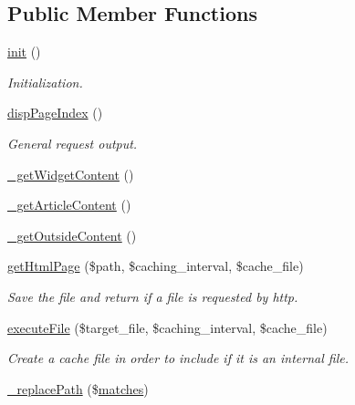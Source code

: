 \subsection*{Public Member Functions}
\begin{DoxyCompactItemize}
\item 
\hyperlink{classpageView_a203a3f77c9ece543e00517e647f1e07b}{init} ()
\begin{DoxyCompactList}\small\item\em Initialization. \end{DoxyCompactList}\item 
\hyperlink{classpageView_a9e3cf0b29ff11a4bbb1ec1ccfacd4236}{disp\+Page\+Index} ()
\begin{DoxyCompactList}\small\item\em General request output. \end{DoxyCompactList}\item 
\hyperlink{classpageView_a5f10c6cf83c7e65e3359423211ead3d8}{\+\_\+get\+Widget\+Content} ()
\item 
\hyperlink{classpageView_a8f6d1347a1991eec2ae2b964f5fec274}{\+\_\+get\+Article\+Content} ()
\item 
\hyperlink{classpageView_aa8045c86496ebdaa32c18e648be079f3}{\+\_\+get\+Outside\+Content} ()
\item 
\hyperlink{classpageView_af3d32b790b5703c5eb384060b24d619e}{get\+Html\+Page} (\$path, \$caching\+\_\+interval, \$cache\+\_\+file)
\begin{DoxyCompactList}\small\item\em Save the file and return if a file is requested by http. \end{DoxyCompactList}\item 
\hyperlink{classpageView_a198777f4c0155f8ad2a0c2826221395e}{execute\+File} (\$target\+\_\+file, \$caching\+\_\+interval, \$cache\+\_\+file)
\begin{DoxyCompactList}\small\item\em Create a cache file in order to include if it is an internal file. \end{DoxyCompactList}\item 
\hyperlink{classpageView_a271e9a47148d838689894366475cefd2}{\+\_\+replace\+Path} (\$\hyperlink{jquery_8mobile_8customized_8min_8js_a0dd9fb10d0da7ad1a1c71aad2c6388f7}{matches})
\end{DoxyCompactItemize}
